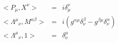 \begin{equation}\label{8}
\begin{array}{rcl}
<P_{\mu},X^{\nu}>&=&i\delta_{\mu}^{\nu}\\
<\Lambda^{\mu}{}_{\nu},M^{\alpha\beta}>&=&i
\left(g^{\alpha\mu}\delta^{\beta}_{\nu}-g^{\beta\mu}\delta^{\alpha}_{\nu}\right)\\
<\Lambda^{\mu}{}_{\nu},1>&=&\delta^{\mu}_{\nu}
\end{array}
\end{equation}

